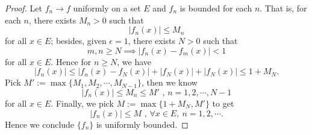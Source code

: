 \begin{Exercise}
	\begin{proof}
		Let $f_n\to f$ uniformly on a set $E$ and $f_n$ is bounded for each $n$.
		That is, for each $n$, there exists $M_n > 0$ such that
		$$
		|f_n(x)| \leq M_n
		$$
		for all $x\in E$; besides, given $\epsilon = 1$, there exists $N>0$ such that
		$$
		m,n \geq N \implies |f_n(x) - f_m(x)| < 1
		$$
		for all $x\in E$.
		Hence for $n\geq N$, we have
		$$
		|f_n(x)|
		\leq |f_n(x) - f_N(x)| + |f_N(x)| + |f_N(x)|
		\leq 1 + M_N.
		$$
		Pick $M' := \max\{M_1,M_2,\cdots,M_{N-1}\}$, then we know
		$$
		|f_n(x)| \leq M_n \leq M' \mbox{ , } n=1,2,\cdots,N-1
		$$
		for all $x\in E$. 
		Finally, we pick $M := \max\{1 + M_N, M'\}$ to get
		$$
		|f_n(x)| \leq M \mbox{ , } \forall x\in E,\ n=1,2,\cdots.
		$$
		Hence we conclude $\{f_n\}$ is uniformly bounded.
	\end{proof}
\end{Exercise}